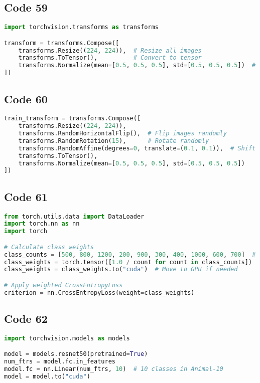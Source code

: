 \documentclass{article}
\begin{document}
\subsection*{Code 59}
\begin{lstlisting}[language=Python]
import torchvision.transforms as transforms

transform = transforms.Compose([
    transforms.Resize((224, 224)),  # Resize all images
    transforms.ToTensor(),          # Convert to tensor
    transforms.Normalize(mean=[0.5, 0.5, 0.5], std=[0.5, 0.5, 0.5])  # Normalize
])

\end{lstlisting}

\subsection*{Code 60}
\begin{lstlisting}[language=Python]
train_transform = transforms.Compose([
    transforms.Resize((224, 224)),
    transforms.RandomHorizontalFlip(),  # Flip images randomly
    transforms.RandomRotation(15),      # Rotate randomly
    transforms.RandomAffine(degrees=0, translate=(0.1, 0.1)),  # Shift image slightly
    transforms.ToTensor(),
    transforms.Normalize(mean=[0.5, 0.5, 0.5], std=[0.5, 0.5, 0.5])
])

\end{lstlisting}

\subsection*{Code 61}
\begin{lstlisting}[language=Python]
from torch.utils.data import DataLoader
import torch.nn as nn
import torch

# Calculate class weights
class_counts = [500, 800, 1200, 200, 900, 300, 400, 1000, 600, 700]  # Replace with actual class counts
class_weights = torch.tensor([1.0 / count for count in class_counts])
class_weights = class_weights.to("cuda")  # Move to GPU if needed

# Apply weighted CrossEntropyLoss
criterion = nn.CrossEntropyLoss(weight=class_weights)

\end{lstlisting}

\subsection*{Code 62}
\begin{lstlisting}[language=Python]
import torchvision.models as models

model = models.resnet50(pretrained=True)
num_ftrs = model.fc.in_features
model.fc = nn.Linear(num_ftrs, 10)  # 10 classes in Animal-10
model = model.to("cuda")

\end{lstlisting}
\end{document}
